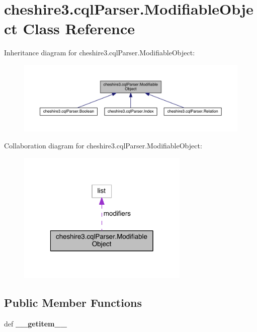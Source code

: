 \hypertarget{classcheshire3_1_1cql_parser_1_1_modifiable_object}{\section{cheshire3.\-cql\-Parser.\-Modifiable\-Object Class Reference}
\label{classcheshire3_1_1cql_parser_1_1_modifiable_object}
}


Inheritance diagram for cheshire3.\-cql\-Parser.\-Modifiable\-Object\-:
\nopagebreak
\begin{figure}[H]
\begin{center}
\leavevmode
\includegraphics[width=350pt]{classcheshire3_1_1cql_parser_1_1_modifiable_object__inherit__graph}
\end{center}
\end{figure}


Collaboration diagram for cheshire3.\-cql\-Parser.\-Modifiable\-Object\-:
\nopagebreak
\begin{figure}[H]
\begin{center}
\leavevmode
\includegraphics[width=232pt]{classcheshire3_1_1cql_parser_1_1_modifiable_object__coll__graph}
\end{center}
\end{figure}
\subsection*{Public Member Functions}
\begin{DoxyCompactItemize}
\item 
\hypertarget{classcheshire3_1_1cql_parser_1_1_modifiable_object_ae5e012605adc4f356bcf9f78bc695d27}{def {\bfseries \-\_\-\-\_\-getitem\-\_\-\-\_\-}}\label{classcheshire3_1_1cql_parser_1_1_modifiable_object_ae5e012605adc4f356bcf9f78bc695d27}

\end{DoxyCompactItemize}
